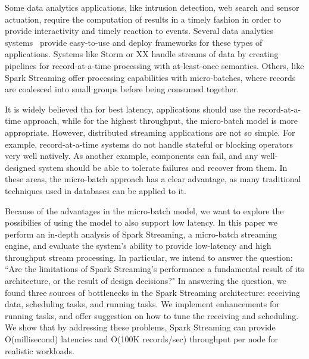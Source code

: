 \noindent Some data analytics applications, like intrusion detection, web search and sensor actuation, require the computation of results in a timely fashion in order to provide interactivity and timely reaction to events.
Several data analytics systems~\cite{Babu:2001:CQO:603867.603884,TelegraphCQ,Storm,SparkStreaming,Trill,Naiad,Niagara,StreamInsight,Carney:2002:MSN:1287369.1287389,Sullivan:1998:TSM:1268256.1268258,Condie:2010:MO:1855711.185573,Brito:2011:SLD:2114498.2116192} provide easy-to-use and deploy frameworks for these types of applications. 
Systems like Storm or XX  handle streams of data by creating pipelines for record-at-a-time processing with at-least-once semantics. 
Others, like Spark Streaming offer processing capabilities with micro-batches, where records are coalesced into small groups before being consumed together.

It is widely believed tha for best latency, applications should use the record-at-a-time approach, while for the highest throughput, the micro-batch model is more appropriate. However, distributed streaming applications are not so simple. For example, record-at-a-time systems do not handle stateful or blocking operators very well natively. As another example, components can fail, and any well-designed system should be able to tolerate failures and recover from them. In these areas, the micro-batch approach has a clear advantage, as many traditional techniques used in databases can be applied to it.


Because of the advantages in the micro-batch model, we want to explore the possibilies of using the model to also support low latency. In this paper we perform an in-depth analysis of Spark Streaming, a micro-batch streaming engine, and evaluate the system's ability to provide low-latency and high throughput stream processing.
In particular, we intend to answer the question: ``Are the limitations of Spark Streaming's performance a fundamental result of its architecture, or the result of design decisions?"
In answering the question, we found three sources of bottlenecks in the Spark Streaming architecture: receiving data, scheduling tasks, and running tasks. We implement enhancements for running tasks, and offer suggestion on how to tune the receiving and scheduling. We show that by addressing these problems, Spark Streaming can provide O(millisecond) latencies and O(100K records/sec) throughput per node for realistic workloads.

